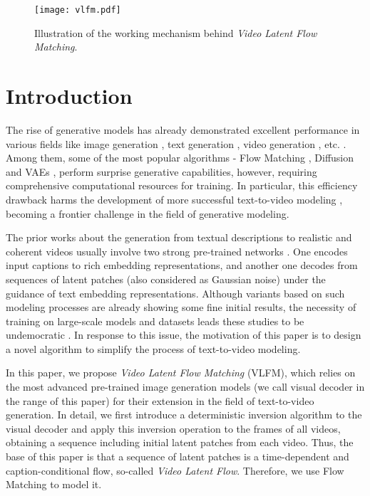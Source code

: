 \ifdefined\isarxiv
\else
\vspace{-8mm}
\fi

\begin{figure*}[!ht]
\begin{center}
\centering
    \texttt{[image: vlfm.pdf]}
\end{center}
\caption{Illustration of the working mechanism behind {\it Video Latent Flow Matching}.}
\label{fig:vlfm}
\end{figure*}

\section{Introduction}

The rise of generative models has already demonstrated excellent performance in various fields like image generation \cite{scs+22,rbl+22}, text generation \cite{aaa23,djp+24,lfx+24}, video generation \cite{bph+24,zpy+24,jsl+24,tjy+24}, etc. \cite{s23}. Among them, some of the most popular algorithms - Flow Matching \cite{lcb+22,lgl22}, Diffusion \cite{hja20,sme20} and VAEs \cite{kw13}, perform surprise generative capabilities, however, requiring comprehensive computational resources for training. In particular, this efficiency drawback harms the development of more successful text-to-video modeling \cite{bph+24}, becoming a frontier challenge in the field of generative modeling.

The prior works about the generation from textual descriptions to realistic and coherent videos usually involve two strong pre-trained networks \cite{hsg+22,zpy+24}. One encodes input captions to rich embedding representations, and another one decodes from sequences of latent patches (also considered as Gaussian noise) under the guidance of text embedding representations. Although variants based on such modeling processes are already showing some fine initial results, the necessity of training on large-scale models and datasets leads these studies to be undemocratic \cite{bph+24,ktz+24}. In response to this issue, the motivation of this paper is to design a novel algorithm to simplify the process of text-to-video modeling.

In this paper, we propose \emph{Video Latent Flow Matching} (VLFM), which relies on the most advanced pre-trained image generation models (we call visual decoder in the range of this paper) for their extension in the field of text-to-video generation. In detail, we first introduce a deterministic inversion algorithm \cite{sme20,lcb+22,lgl22} to the visual decoder and apply this inversion operation to the frames of all videos, obtaining a sequence including initial latent patches from each video. Thus, the base of this paper is that a sequence of latent patches is a time-dependent and caption-conditional flow, so-called {\it Video Latent Flow}. Therefore, we use Flow Matching \cite{lcb+22,lgl22} to model it. 

